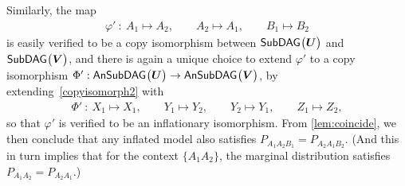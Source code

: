 {Similarly, the map 
\begin{align}\label{copyisomorph2}
	\varphi' \: : \: A_1 \mapsto A_2,\qquad A_2\mapsto A_1,\qquad B_1\mapsto B_2
\end{align}
is easily verified to be a copy isomorphism between ${\operatorname{\mathsf{SubDAG}}_{}}\bigl\lparen\bm{U}\bigr\rparen$ and ${\operatorname{\mathsf{SubDAG}}_{}}\bigl\lparen\bm{V}\bigr\rparen$, and there is again a unique choice to extend $\varphi'$ to a copy isomorphism $\Phi':{\operatorname{\mathsf{AnSubDAG}}_{}}\bigl\lparen\bm{U}\bigr\rparen\to{\operatorname{\mathsf{AnSubDAG}}_{}}\bigl\lparen\bm{V}\bigr\rparen$, by extending~\cref{copyisomorph2} with
\begin{align}
\Phi' \: : \: X_1\mapsto X_1,\qquad Y_1\mapsto Y_2, \qquad Y_2 \mapsto Y_1, \qquad Z_1 \mapsto Z_2,
\end{align}
so that $\varphi'$ is verified to be an inflationary isomorphism. From \cref{lem:coincide}, we then conclude that any inflated model also satisfies $P_{A_1 A_2 B_1} = P_{A_2 A_1 B_2}$.  (And this in turn implies that for the context $\{A_1 A_2\}$, the marginal distribution satisfies $P_{A_1 A_2} = P_{A_2 A_1}$.)


}
